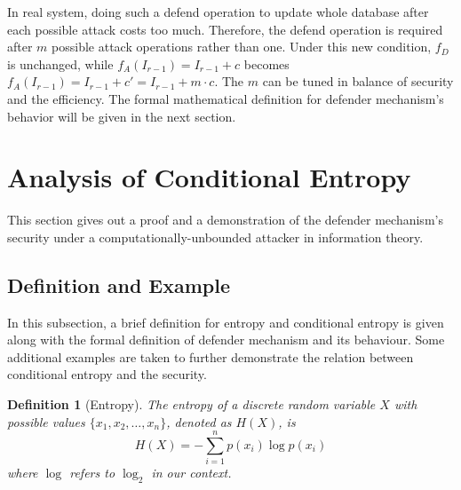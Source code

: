\documentclass[10pt, conference, compsocconf]{IEEEtran}
\newtheorem{mydef}{Definition}
\begin{document}

        In real system, doing such a defend operation to update whole
        database after each possible attack costs too much.
        Therefore, the defend operation is required after $m$
        possible attack operations rather than one. Under this
        new condition, $f_D$ is unchanged, while $f_A(I_{r-1}) = I_{r-1}+c$
        becomes $f_A(I_{r-1}) = I_{r-1}+c' = I_{r-1}+m \cdot c$.
        The $m$ can be tuned in balance of security and the
        efficiency. The formal mathematical definition for
        defender mechanism's behavior will be given in the
        next section.

\section{Analysis of Conditional Entropy}\label{sec_proof}
    This section gives out a proof
    and a demonstration
    of the defender mechanism's security under a computationally-unbounded attacker
    in information theory.

    \subsection{Definition and Example}
        In this subsection, a brief definition for entropy and conditional
        entropy is given along with the formal definition of defender mechanism
        and its behaviour.
        Some additional examples are taken to further
        demonstrate the relation between conditional entropy and
        the security.

        \begin{mydef}[Entropy\cite{entropy}]\label{def_entropy}
            The entropy of a discrete random variable $X$ with
            possible values $\{x_1, x_2, \ldots, x_n\}$, denoted as  $H(X)$, is
            \begin{equation}
                H(X) = -\sum_{i=1}^n p(x_i)\log p(x_i)
            \end{equation}
            where $\log$ refers to $\log_2$ in our context.
        \end{mydef}
\end{document}
